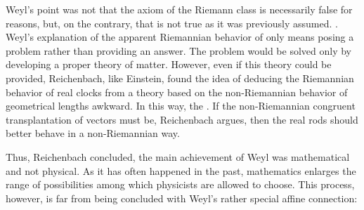 \documentclass[final]{article}
\begin{document}
Weyl's point was not that the axiom of the Riemann class is necessarily false for \apr reasons, but, on the contrary, that is not \apr true as it was previously assumed. . Weyl's explanation of the apparent Riemannian behavior of   \citep[368]{Reichenbach1922a} only means posing a problem rather than providing an answer. The problem would be solved only by developing a proper theory of matter. However, even if this theory could be provided, Reichenbach, like Einstein, found the idea of deducing the Riemannian behavior of real clocks from a theory based on the non-Riemannian behavior of geometrical lengths awkward. In this way, the   \citep[368]{Reichenbach1922a}. If the non-Riemannian congruent transplantation of vectors must be, Reichenbach argues, then the real rods should better behave in a non-Riemannian way.

Thus, Reichenbach concluded, the main achievement of Weyl was mathematical and not physical. As it has often happened in the past, mathematics enlarges the range of possibilities among which physicists are allowed to choose. This process, however, is  far from being concluded with Weyl's rather special affine connection:
\end{document}
